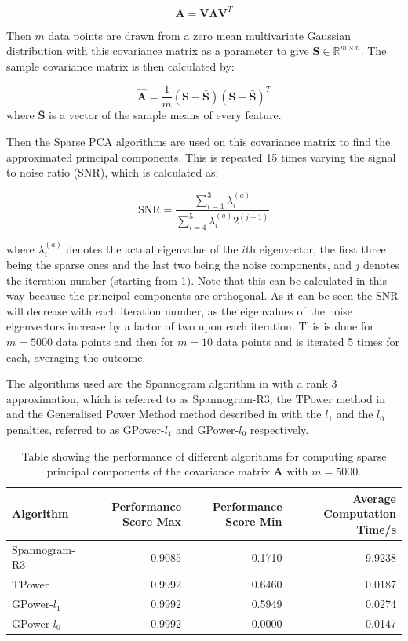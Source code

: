 \documentclass[11pt,a4paper]{article}
\begin{document}
\begin{equation*}
\mathbf{A} = \mathbf{V}\mathbf{\Lambda}\mathbf{V}^T
\end{equation*}


Then $m$ data points are drawn from a  zero mean multivariate Gaussian distribution  with this covariance matrix as a parameter to give $\mathbf{S} \in \mathbb{R}^{m \times n}$. The sample covariance matrix is then calculated by:

\begin{equation*}
\mathbf{\hat{A}} = \frac{1}{m}\left(\mathbf{S} - \bar{\mathbf{S}}\right)\left(\mathbf{S} - \bar{\mathbf{S}}\right)^T
\end{equation*}
where $\bar{\mathbf{S}}$ is a vector of the sample means of every feature.

Then the Sparse PCA algorithms are used on this covariance matrix to find the approximated principal components. This is repeated 15 times varying the signal to noise ratio (SNR), which is calculated as:

\begin{equation*}
\text{SNR} = \frac{\sum_{i = 1}^3\lambda_i^{(a)}}{\sum_{i = 4}^5\lambda_i^{(a)}2^{(j-1)}}
\end{equation*}

where $\lambda_i^{(a)}$ denotes the actual eigenvalue of the $i$th eigenvector, the first three being the sparse ones and the last two being the noise components, and $j$ denotes the iteration number (starting from 1). Note that this can be calculated in this way because the principal components are orthogonal. As it can be seen the SNR will decrease with each iteration number, as the eigenvalues of the noise eigenvectors increase by a factor of two upon each iteration. This is done for $m=5000$ data points and then for $m=10$ data points and is iterated 5 times for each, averaging the outcome. 

The algorithms used are the Spannogram algorithm in \cite{dimakis} with a rank 3 approximation, which is referred to as Spannogram-R3; the TPower method in \cite{truncpower} and the Generalised Power Method method described in \cite{GPower} with the $l_1$ and the $l_0$ penalties, referred to as GPower-$l_1$ and GPower-$l_0$ respectively.

\begin{table}[H]
\center
\begin{tabular}{|l|r|r|r|}
\hline
Algorithm &  Performance Score Max &  Performance Score Min & Average Computation Time/s\\
\hline
Spannogram-R3 &0.9085 &    0.1710 &   9.9238\\
TPower &    0.9992 &   0.6460&    0.0187 \\
 GPower-$l_1$&   0.9992  &  0.5949&    0.0274\\
 GPower-$l_0$  & 0.9992&         0.0000   & 0.0147\\
\hline

\end{tabular}
\caption{Table showing the performance of different algorithms for computing sparse principal components of the covariance matrix $\mathbf{A}$ with $m=5000$.}
\label{performance_5000}
\end{table}
\end{document}
